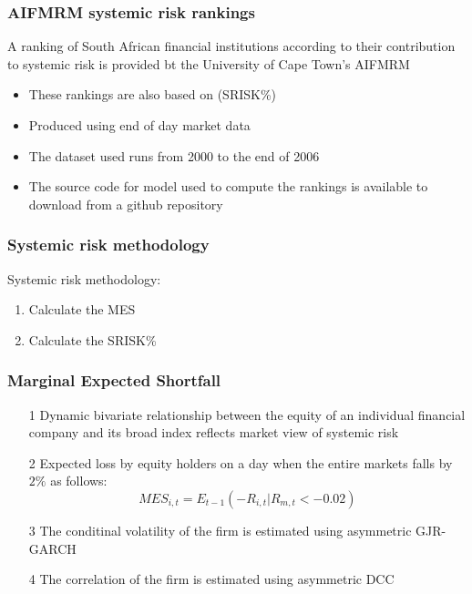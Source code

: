 \documentclass[11pt]{beamer}
\begin{document}

\begin{frame}
\frametitle{AIFMRM systemic risk rankings}
A ranking of South African financial institutions according to their contribution to systemic risk is provided bt the University of Cape Town's AIFMRM
\begin{itemize}
\item These rankings are also based on (SRISK\%)
\item Produced using end of day market data
\item The dataset used runs from 2000 to the end of 2006
\item The source code for model used to compute the rankings is available to download from a github repository
\end{itemize}

\end{frame}


\begin{frame}
\frametitle{Systemic risk methodology}
Systemic risk methodology:
\begin{enumerate}
\item Calculate the MES
\item Calculate the SRISK\%
\end{enumerate}
\end{frame}


\begin{frame}
\frametitle{Marginal Expected Shortfall}

\begin{enumerate}\itemsep10pt
	\item[1] Dynamic bivariate relationship between the equity of an individual financial company and its broad index reflects market view of systemic risk
	\item[2] Expected loss by equity holders on a day when the entire markets falls by $2\%$ as follows:
      \begin{equation*}
          MES_{i,t} = E_{t-1}(-R_{i,t} | R_{m,t} < -0.02)
      \end{equation*}
	\item[3] The conditinal volatility of the firm is estimated using asymmetric GJR-GARCH
	\item[4] The correlation of the firm is estimated using asymmetric DCC
\end{enumerate}
\end{frame}
\end{document}
